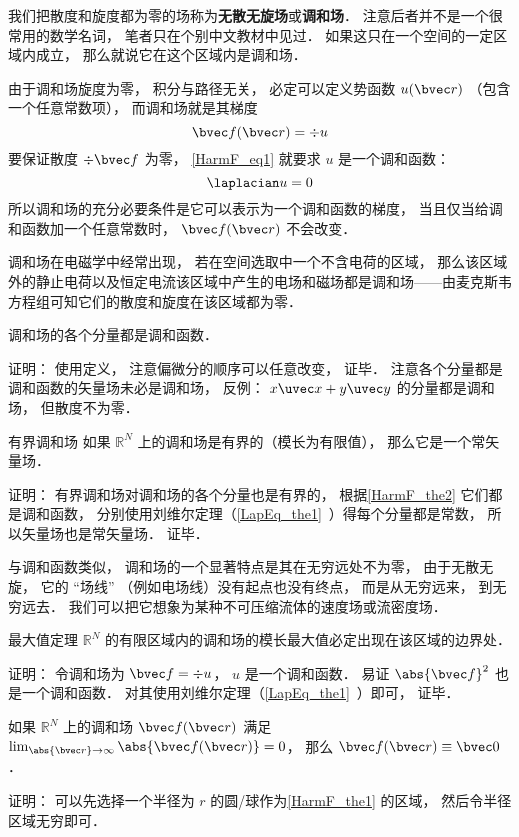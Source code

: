 

我们把散度和旋度都为零的场称为\textbf{无散无旋场}或\textbf{调和场}． 注意后者并不是一个很常用的数学名词， 笔者只在个别中文教材中见过． 如果这只在一个空间的一定区域内成立， 那么就说它在这个区域内是调和场．

由于调和场旋度为零， 积分与路径无关， 必定可以定义势函数 $u(\bvec r)$ （包含一个任意常数项）， 而调和场就是其梯度
\begin{equation}\label{HarmF_eq1}
\bvec f(\bvec r) = \div u
\end{equation}
要保证散度 $\div \bvec f$ 为零， \autoref{HarmF_eq1} 就要求 $u$ 是一个调和函数：
\begin{equation}
\laplacian u = 0
\end{equation}
所以调和场的充分必要条件是它可以表示为一个调和函数的梯度， 当且仅当给调和函数加一个任意常数时， $\bvec f(\bvec r)$ 不会改变．

调和场在电磁学中经常出现， 若在空间选取中一个不含电荷的区域， 那么该区域外的静止电荷以及恒定电流该区域中产生的电场和磁场都是调和场——由麦克斯韦方程组可知它们的散度和旋度在该区域都为零．

\begin{theorem}{}\label{HarmF_the2}
调和场的各个分量都是调和函数．
\end{theorem}
证明： 使用定义， 注意偏微分的顺序可以任意改变， 证毕． 注意各个分量都是调和函数的矢量场未必是调和场， 反例： $x\uvec x + y \uvec y$ 的分量都是调和场， 但散度不为零．

\begin{corollary}{有界调和场}
如果 $\mathbb R^N$ 上的调和场是有界的（模长为有限值）， 那么它是一个常矢量场．
\end{corollary}
证明： 有界调和场对调和场的各个分量也是有界的， 根据\autoref{HarmF_the2} 它们都是调和函数， 分别使用刘维尔定理（\autoref{LapEq_the1}~）得每个分量都是常数， 所以矢量场也是常矢量场． 证毕．

与调和函数类似， 调和场的一个显著特点是其在无穷远处不为零， 由于无散无旋， 它的 “场线” （例如电场线）没有起点也没有终点， 而是从无穷远来， 到无穷远去． 我们可以把它想象为某种不可压缩流体的速度场或流密度场．

\begin{theorem}{最大值定理}\label{HarmF_the1}
$\mathbb R^N$ 的有限区域内的调和场的模长最大值必定出现在该区域的边界处．
\end{theorem}
证明： 令调和场为 $\bvec f = \div u$， $u$ 是一个调和函数． 易证 $\abs{\bvec f}^2$ 也是一个调和函数． 对其使用刘维尔定理（\autoref{LapEq_the1}~）即可， 证毕．

\begin{corollary}{}
如果 $\mathbb R^N$ 上的调和场 $\bvec f(\bvec r)$ 满足 $\lim_{\abs{\bvec r}\to \infty} \abs{\bvec f(\bvec r)}  = 0$， 那么 $\bvec f(\bvec r) \equiv \bvec 0$．
\end{corollary}
证明： 可以先选择一个半径为 $r$ 的圆/球作为\autoref{HarmF_the1} 的区域， 然后令半径区域无穷即可．
